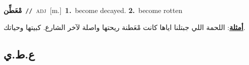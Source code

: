 \documentclass[10pt,a4paper,twoside]{article} %
\begin{document}
\begin{multicols}{2}
{\setlength\topsep{0pt}\textbf{\foreignlanguage{arabic}{مْعَطِّن}}\ {\color{gray}\texttt{//}\color{black}}\ \textsc{adj}\ [m.]\ \textbf{1.}~become decayed.  \textbf{2.}~become rotten\  \begin{flushright}\color{gray}\foreignlanguage{arabic}{\textbf{\underline{\foreignlanguage{arabic}{أمثلة}}}: اللحمة اللي جبتلنا اياها كانت مْعَطنة ريحتها واصلة لآخر الشارع. كبيتها وحياتك.}\end{flushright}\color{black}} \vspace{2mm}

\vspace{-3mm}
\subsection*{\color{blue}\foreignlanguage{arabic}{ع.ط.ي}\color{blue}{}} 


\end{multicols}
\end{document}
